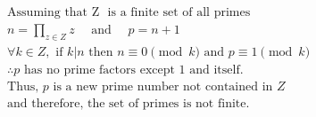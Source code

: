 $$
\begin{aligned}
&\text{Assuming that Z }\text{ is a finite set of all primes} \\
&n = \prod_{z \in Z}^{} z \quad \text{ and } \quad p = n+1 \\
&\forall k \in Z, \text{ if } k | n \text{ then } n \equiv 0 \pmod{k} \text{ and } p \equiv 1 \pmod{k} \\
&\therefore p \text{ has no prime factors except 1 and itself.} \\
&\text{Thus, } p \text{ is a new prime number not contained in } Z \\
&\text{and therefore, the set of primes is not finite.}
\end{aligned}
$$

